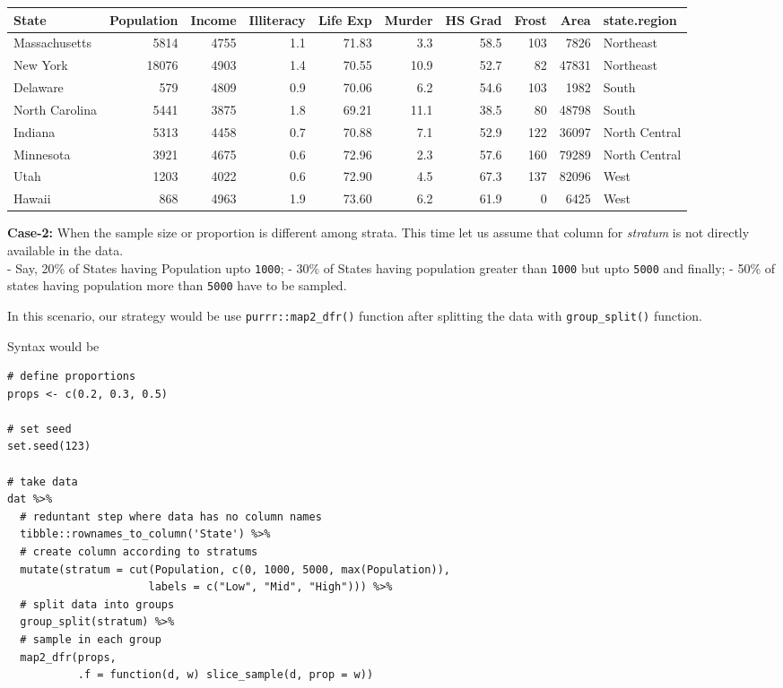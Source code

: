 \documentclass[
]{book}
\begin{document}
\begin{tabular}{l|r|r|r|r|r|r|r|r|l}
\hline
State & Population & Income & Illiteracy & Life Exp & Murder & HS Grad & Frost & Area & state.region\\
\hline
Massachusetts & 5814 & 4755 & 1.1 & 71.83 & 3.3 & 58.5 & 103 & 7826 & Northeast\\
\hline
New York & 18076 & 4903 & 1.4 & 70.55 & 10.9 & 52.7 & 82 & 47831 & Northeast\\
\hline
Delaware & 579 & 4809 & 0.9 & 70.06 & 6.2 & 54.6 & 103 & 1982 & South\\
\hline
North Carolina & 5441 & 3875 & 1.8 & 69.21 & 11.1 & 38.5 & 80 & 48798 & South\\
\hline
Indiana & 5313 & 4458 & 0.7 & 70.88 & 7.1 & 52.9 & 122 & 36097 & North Central\\
\hline
Minnesota & 3921 & 4675 & 0.6 & 72.96 & 2.3 & 57.6 & 160 & 79289 & North Central\\
\hline
Utah & 1203 & 4022 & 0.6 & 72.90 & 4.5 & 67.3 & 137 & 82096 & West\\
\hline
Hawaii & 868 & 4963 & 1.9 & 73.60 & 6.2 & 61.9 & 0 & 6425 & West\\
\hline
\end{tabular}

\textbf{Case-2:} When the sample size or proportion is different among strata.
This time let us assume that column for \emph{stratum} is not directly available in the data.\\
- Say, 20\% of States having Population upto \texttt{1000};
- 30\% of States having population greater than \texttt{1000} but upto \texttt{5000} and finally;
- 50\% of states having population more than \texttt{5000} have to be sampled.

In this scenario, our strategy would be use \texttt{purrr::map2\_dfr()} function after splitting the data with \texttt{group\_split()} function.

Syntax would be

\begin{verbatim}
# define proportions
props <- c(0.2, 0.3, 0.5)

# set seed
set.seed(123)

# take data
dat %>% 
  # reduntant step where data has no column names
  tibble::rownames_to_column('State') %>%
  # create column according to stratums
  mutate(stratum = cut(Population, c(0, 1000, 5000, max(Population)),
                      labels = c("Low", "Mid", "High"))) %>% 
  # split data into groups
  group_split(stratum) %>% 
  # sample in each group
  map2_dfr(props,
           .f = function(d, w) slice_sample(d, prop = w))
\end{verbatim}
\end{document}
